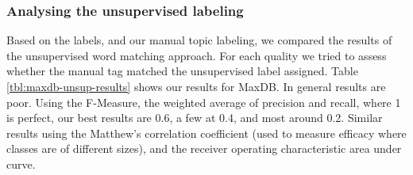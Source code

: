 \documentclass{acm_proc_article-sp}
\begin{document}
\subsubsection{Analysing the unsupervised labeling}
Based on the labels, and our manual topic labeling, we compared the results of the unsupervised word matching approach. For each quality we tried to assess whether the manual tag matched the unsupervised label assigned. Table \ref{tbl:maxdb-unsup-results} shows our results for MaxDB. In general results are poor. Using the F-Measure, the weighted average of precision and recall, where 1 is perfect, our best results are 0.6, a few at 0.4, and most around 0.2. Similar results using the Matthew's correlation coefficient (used to measure efficacy where classes are of different sizes), and the receiver operating characteristic area under curve. 
\end{document}
